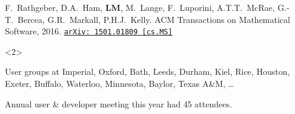 \documentclass[presentation]{beamer}
\newcommand{\arxivlink}[2]{%
  \href{http://www.arxiv.org/abs/#1}%
  {\texttt{arXiv:\,#1\,[#2]}}%
}
\begin{document}
\begin{frame}
\begin{overlayarea}{\textwidth}{0.8\textheight}
\begin{onlyenv}
    \begin{flushright}
      {\scriptsize F.~Rathgeber, D.A.~Ham, \textbf{LM}, M.~Lange,
        F.~Luporini, A.T.T.~McRae, G.-T.~Bercea, G.R.~Markall,
        P.H.J.~Kelly. ACM Transactions on Mathematical Software,
        2016. \arxivlink{1501.01809}{cs.MS}\nocite{Rathgeber:2016}}
    \end{flushright}
  \end{onlyenv}
  \begin{onlyenv}<2>
    \begin{block}{User groups at}
      Imperial, Oxford, Bath, Leeds, Durham, Kiel, Rice, Houston,
      Exeter, Buffalo, Waterloo, Minnesota, Baylor, Texas A\&M, \dots

      Annual user \& developer meeting this year had 45 attendees.
    \end{block}
  \end{onlyenv}
\end{overlayarea}
\end{frame}
\end{document}
